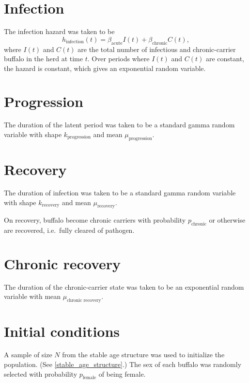 \documentclass[12pt]{article}
\begin{document}
\section{Infection}

The infection hazard was taken to be
\begin{equation}
  h_{\text{infection}}(t) = \beta_{\text{acute}} I(t) +
  \beta_{\text{chronic}} C(t),
\end{equation}
where $I(t)$ and $C(t)$ are the total number of infectious and
chronic-carrier buffalo in the herd at time $t$.  Over periods where
$I(t)$ and $C(t)$ are constant, the hazard is constant, which gives an
exponential random variable.


\section{Progression}

The duration of the latent period was taken to be a standard gamma
random variable with shape $k_{\text{progression}}$
and mean $\mu_{\text{progression}}$.


\section{Recovery}

The duration of infection was taken to be a standard gamma random
variable with shape $k_{\text{recovery}}$ and mean
$\mu_{\text{recovery}}$.

On recovery, buffalo become chronic carriers with probability
$p_{\text{chronic}}$ or otherwise are recovered, i.e.~fully cleared
of pathogen.


\section{Chronic recovery}

The duration of the chronic-carrier state was taken to be an
exponential random variable with mean
$\mu_{\text{chronic recovery}}$.


\section{Initial conditions}

A sample of size $N$ from the stable age structure was used to
initialize the population.  (See \autoref{stable_age_structure}.)  The
sex of each buffalo was randomly selected with probability
$p_{\text{female}}$ of being female.
\end{document}
